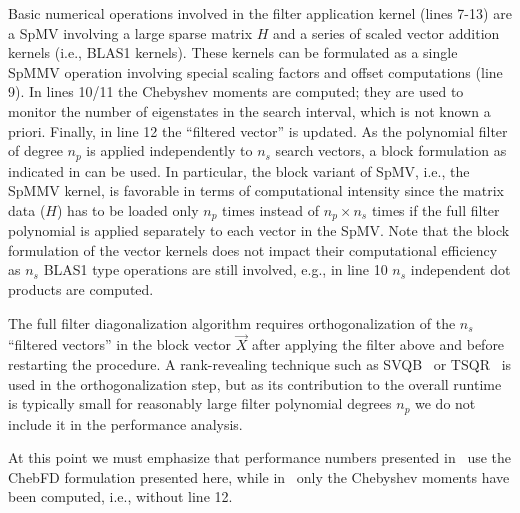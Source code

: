 \documentclass[letterpaper]{llncs}
\begin{document}
Basic numerical operations involved in the filter application kernel
(lines 7-13) are a SpMV
involving a large sparse matrix $H$ and a series of scaled vector
addition kernels (i.e., BLAS1 kernels). These kernels can be formulated
as a single SpMMV operation involving special scaling
factors and offset computations (line 9). In lines 10/11 the Chebyshev
moments are computed; they are used to monitor the number of
eigenstates in the search interval, which is not known
a priori. Finally, in line 12 the ``filtered vector'' is updated. As
the polynomial filter of degree $n_p$ is applied independently
to $n_s$ search vectors, a block formulation as indicated in
 can be used. In particular, the block
variant of SpMV, i.e., the SpMMV kernel, is favorable in terms of computational intensity since the
matrix data ($H$) has to be loaded only $n_p$ times instead of $n_p
\times n_s $ times if the full filter polynomial is applied separately to
each vector in the SpMV. Note that the block formulation of the vector kernels
does not impact their computational efficiency as $n_s$ BLAS1 type
operations are still involved, e.g., in line 10 $n_s$ independent dot products
are computed.

The full filter diagonalization algorithm requires orthogonalization
of the $n_s$ ``filtered vectors'' in the block vector ${\vec
  X}$ after applying the filter above and before restarting the
procedure. A rank-revealing technique such as SVQB~\cite{SW02} or
TSQR~\cite{DGHL12} is used in the orthogonalization step, but as its
contribution to the overall runtime is typically small for reasonably
large filter polynomial degrees $n_p$ we do not include it in the
performance analysis.

At this point we must emphasize that performance numbers presented
in~\cite{Pieper15ChebFD} use the ChebFD formulation presented here, while
in~\cite{Kreutzer15KPM} only the Chebyshev moments have been computed,
i.e.,  without line 12.
\end{document}
